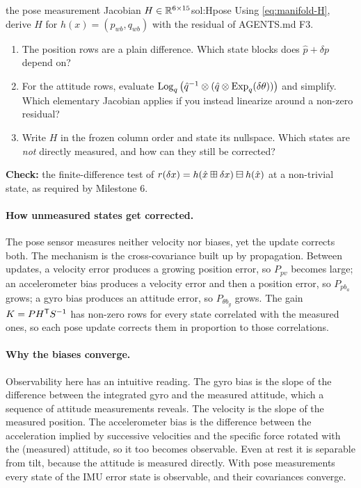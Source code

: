 \begin{derivex}{the pose measurement Jacobian $H \in \mathbb{R}^{6\times15}$}{sol:Hpose}
Using \eqref{eq:manifold-H}, derive $H$ for $h(x) = (p_{wb}, q_{wb})$ with the residual of AGENTS.md F3.
\begin{enumerate}
  \item The position rows are a plain difference. Which state blocks does $\hat p + \delta p$ depend on?
  \item For the attitude rows, evaluate $\operatorname{Log}_q\big(\hat q^{-1}\otimes(\hat q\otimes\operatorname{Exp}_q(\delta\theta))\big)$ and simplify.
        Which elementary Jacobian applies if you instead linearize around a non-zero residual?
  \item Write $H$ in the frozen column order and state its nullspace. Which states are \emph{not} directly measured,
        and how can they still be corrected?
\end{enumerate}
\textbf{Check:} the finite-difference test of $r(\delta x) = h(\hat x\boxplus\delta x)\boxminus h(\hat x)$ at a non-trivial state, as
required by Milestone 6.
\end{derivex}

\paragraph{How unmeasured states get corrected.} The pose sensor measures neither velocity nor biases, yet the
update corrects both. The mechanism is the cross-covariance built up by propagation. Between updates, a velocity
error produces a growing position error, so $P_{pv}$ becomes large; an accelerometer bias produces a velocity error
and then a position error, so $P_{p b_a}$ grows; a gyro bias produces an attitude error, so $P_{\theta b_g}$ grows. The gain
$K = PH^{\mathsf{T}} S^{-1}$ has non-zero rows for every state correlated with the measured ones, so each pose update corrects
them in proportion to those correlations.

\paragraph{Why the biases converge.} Observability here has an intuitive reading. The gyro bias is the slope of the
difference between the integrated gyro and the measured attitude, which a sequence of attitude measurements reveals.
The velocity is the slope of the measured position. The accelerometer bias is the difference between the
acceleration implied by successive velocities and the specific force rotated with the (measured) attitude, so it
too becomes observable. Even at rest it is separable from tilt, because the attitude is measured directly. With
pose measurements every state of the IMU error state is observable, and their covariances converge.

